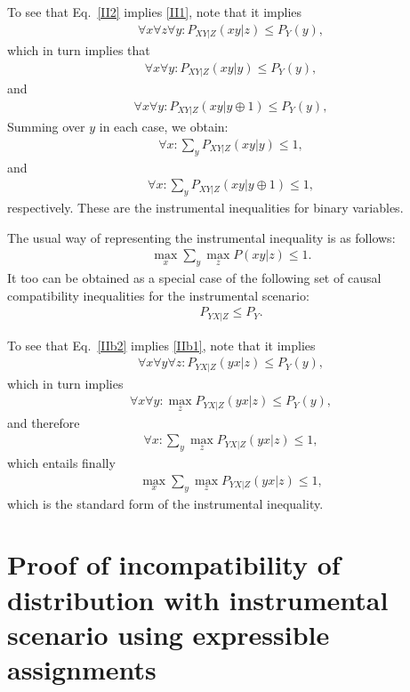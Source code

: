 \documentclass[aps,english,superscriptaddress,onecolumn,twoside,longbibliography,pra,floatfix,fleqn,nofootinbib]{revtex4-1}%
\theoremstyle{definition}
\begin{document}
To see that Eq.~\eqref{II2} implies \eqref{II1}, note that it implies 
\begin{align}
\forall x \forall z \forall y:  P_{XY|Z}(xy|z) \le P_Y(y),
\end{align}
which in turn implies that
\begin{align}
\forall x  \forall y:  P_{XY|Z}(xy|y) \le P_Y(y),
\end{align}
and 
\begin{align}
\forall x  \forall y:  P_{XY|Z}(xy|y\oplus 1) \le P_Y(y),
\end{align}
Summing over $y$ in each case, we obtain:
\begin{align}
\forall x : \sum_y  P_{XY|Z}(xy|y) \le 1,
\end{align}
and 
\begin{align}
\forall x : \sum_y  P_{XY|Z}(xy|y\oplus 1) \le 1,
\end{align}
respectively.  
These are the  instrumental inequalities for binary variables.  


The usual way of representing the instrumental inequality is as follows:
\begin{align}
\max_x \sum_y \max_z P(xy|z) \le 1.
\label{IIb1}
\end{align}
It too can be obtained as a special case of the following set of causal compatibility inequalities for the instrumental scenario:
\begin{align}
P_{YX|Z} \le P_Y.
\label{IIb2}
\end{align}

To see that Eq.~\eqref{IIb2} implies \eqref{IIb1}, note that it implies 
\begin{align}
\forall x \forall y \forall z: P_{YX|Z}(yx|z) \le P_Y (y),
\end{align}
which in turn implies 
\begin{align}
\forall x \forall y :\max_z P_{YX|Z}(yx|z) \le P_Y (y),
\end{align}
and therefore
\begin{align}
\forall x : \sum_y \max_z P_{YX|Z}(yx|z) \le 1,
\end{align}
which entails finally 
\begin{align}
\max_x \sum_y \max_z P_{YX|Z}(yx|z) \le 1,
\end{align}
which is the standard form of the instrumental inequality.

\section{Proof of incompatibility of distribution with instrumental scenario using expressible assignments}
\end{document}
